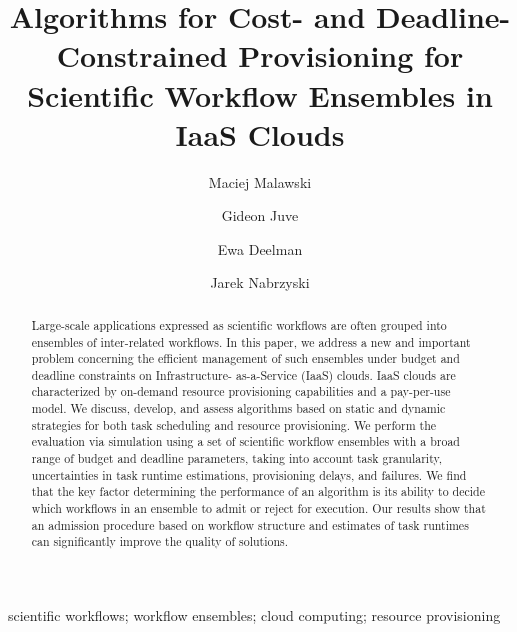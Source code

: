 \documentclass[preprint,5p]{elsarticle}
\begin{document}
\begin{frontmatter}

\title{Algorithms for Cost- and Deadline-Constrained Provisioning for Scientific Workflow
Ensembles in IaaS Clouds}

\author[agh]{Maciej Malawski}
\author[isi]{Gideon Juve}
\author[isi]{Ewa Deelman}
\author[nd]{Jarek Nabrzyski}

\address[agh]{AGH University of Science and Technology, Dept. of Computer Science, Al. Mickiewicza 30, Krakow, Poland} 
\address[isi]{USC Information Sciences Institute, 4676 Admiralty Way, Marina del Rey, CA, USA} 
\address[nd]{University of Notre Dame, Center for Research Computing, 111 ITC, Notre Dame, IN, USA}

\begin{abstract}

Large-scale applications expressed as scientific workflows are often grouped
into ensembles of inter-related workflows. In this paper, we address a new and
important problem concerning the efficient management of such ensembles under
budget and deadline constraints on Infrastructure- as-a-Service (IaaS) clouds.
IaaS clouds are characterized by on-demand resource provisioning capabilities
and a pay-per-use model. We discuss, develop, and assess algorithms based on
static and dynamic strategies for both task scheduling and resource
provisioning. We perform the evaluation via simulation using a set of scientific
workflow ensembles with a broad range of budget and deadline parameters, taking
into account task granularity, uncertainties in task runtime estimations,
provisioning delays, and failures. We find that the key factor determining the
performance of an algorithm is its ability to decide which workflows in an
ensemble to admit or reject for execution. Our results show that an admission
procedure based on workflow structure and estimates of task runtimes can
significantly improve the quality of solutions.

\end{abstract}

\begin{keyword}
scientific workflows; workflow ensembles; cloud computing; resource provisioning
\end{keyword}

\end{frontmatter}
\end{document}
